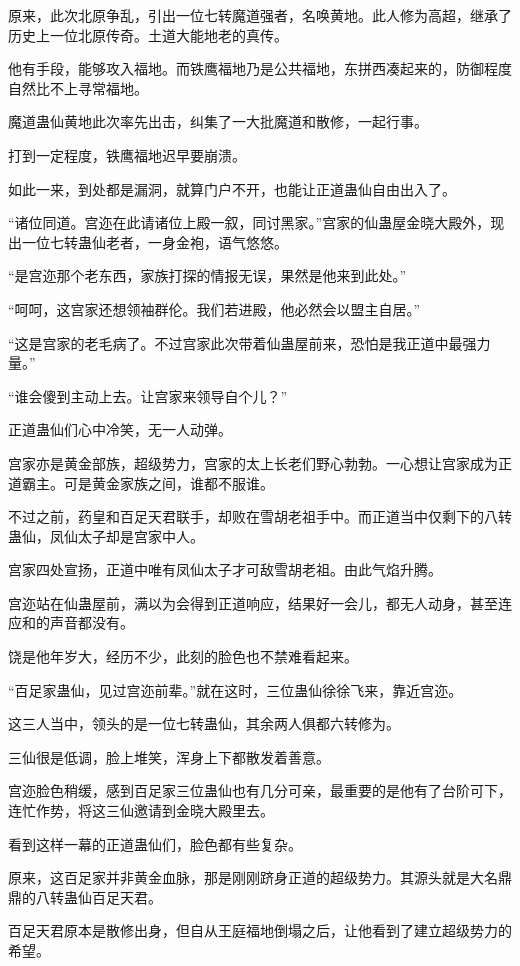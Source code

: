 \begin{this_body}
原来，此次北原争乱，引出一位七转魔道强者，名唤黄地。此人修为高超，继承了历史上一位北原传奇。土道大能地老的真传。

他有手段，能够攻入福地。而铁鹰福地乃是公共福地，东拼西凑起来的，防御程度自然比不上寻常福地。

魔道蛊仙黄地此次率先出击，纠集了一大批魔道和散修，一起行事。

打到一定程度，铁鹰福地迟早要崩溃。

如此一来，到处都是漏洞，就算门户不开，也能让正道蛊仙自由出入了。

“诸位同道。宫迩在此请诸位上殿一叙，同讨黑家。”宫家的仙蛊屋金晓大殿外，现出一位七转蛊仙老者，一身金袍，语气悠悠。

“是宫迩那个老东西，家族打探的情报无误，果然是他来到此处。”

“呵呵，这宫家还想领袖群伦。我们若进殿，他必然会以盟主自居。”

“这是宫家的老毛病了。不过宫家此次带着仙蛊屋前来，恐怕是我正道中最强力量。”

“谁会傻到主动上去。让宫家来领导自个儿？”

正道蛊仙们心中冷笑，无一人动弹。

宫家亦是黄金部族，超级势力，宫家的太上长老们野心勃勃。一心想让宫家成为正道霸主。可是黄金家族之间，谁都不服谁。

不过之前，药皇和百足天君联手，却败在雪胡老祖手中。而正道当中仅剩下的八转蛊仙，凤仙太子却是宫家中人。

宫家四处宣扬，正道中唯有凤仙太子才可敌雪胡老祖。由此气焰升腾。

宫迩站在仙蛊屋前，满以为会得到正道响应，结果好一会儿，都无人动身，甚至连应和的声音都没有。

饶是他年岁大，经历不少，此刻的脸色也不禁难看起来。

“百足家蛊仙，见过宫迩前辈。”就在这时，三位蛊仙徐徐飞来，靠近宫迩。

这三人当中，领头的是一位七转蛊仙，其余两人俱都六转修为。

三仙很是低调，脸上堆笑，浑身上下都散发着善意。

宫迩脸色稍缓，感到百足家三位蛊仙也有几分可亲，最重要的是他有了台阶可下，连忙作势，将这三仙邀请到金晓大殿里去。

看到这样一幕的正道蛊仙们，脸色都有些复杂。

原来，这百足家并非黄金血脉，那是刚刚跻身正道的超级势力。其源头就是大名鼎鼎的八转蛊仙百足天君。

百足天君原本是散修出身，但自从王庭福地倒塌之后，让他看到了建立超级势力的希望。


\end{this_body}
